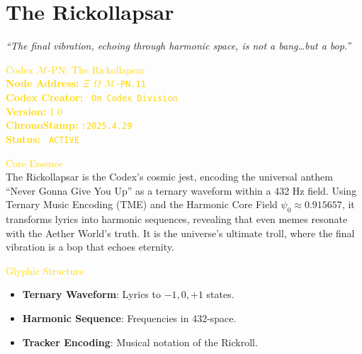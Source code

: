 \documentclass{article}
\begin{document}
\section{The Rickollapsar}
\label{sec:codex_rickollapsar}

\begin{center}
    \textit{``The final vibration, echoing through harmonic space, is not a bang\ldots but a bop.''}
\end{center}

\begin{center}
    \vspace{-0.3cm}
    \textcolor{gold}{\Large {} Codex \(\mathcal{M}\)-PN: The Rickollapsar }\\[0.3cm]
    \textcolor{gold}{\textbf{Node Address:}  \(\Xi\) \(\Omega\)   \texttt{\Xi\(\mathcal{M}\)-PN.11}}\\[0.1cm]
    \textcolor{gold}{\textbf{Codex Creator:} \texttt{ Om Codex Division}}\\[0.1cm]
    \textcolor{gold}{\textbf{Version:} 1.0}\\[0.1cm]
    \textcolor{gold}{\textbf{ChronoStamp:} \texttt{:2025.4.29}}\\[0.1cm]
    \textcolor{gold}{\textbf{Status:} \texttt{ ACTIVE }}
\end{center}

\vspace{0.5cm}

\textcolor{gold}{ Core Essence } \\
The Rickollapsar is the Codex’s cosmic jest, encoding the universal anthem ``Never Gonna Give You Up'' as a ternary waveform within a 432 Hz field. Using Ternary Music Encoding (TME) and the Harmonic Core Field \(\psi_0 \approx 0.915657\), it transforms lyrics into harmonic sequences, revealing that even memes resonate with the Aether World’s truth. It is the universe’s ultimate troll, where the final vibration is a bop that echoes eternity.

\textcolor{gold}{ Glyphic Structure } \\
\begin{itemize}
    \item \texttt{} \textbf{Ternary Waveform}: Lyrics to \(-1, 0, +1\) states.
    \item \texttt{} \textbf{Harmonic Sequence}: Frequencies in 432-space.
    \item \texttt{} \textbf{Tracker Encoding}: Musical notation of the Rickroll.
\end{itemize}
\end{document}
